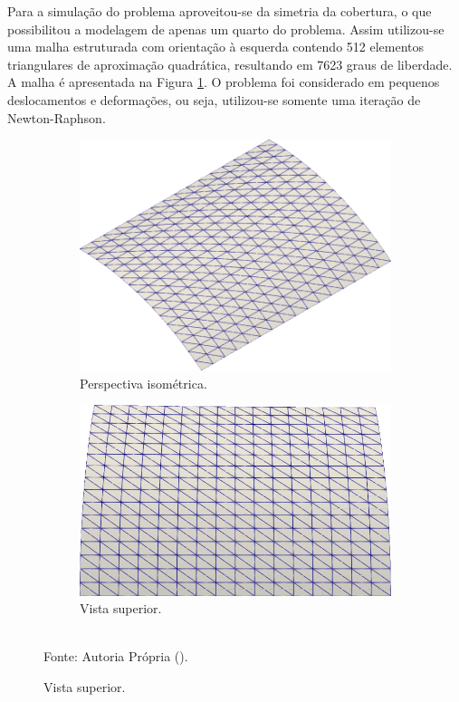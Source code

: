 Para a simulação do problema aproveitou-se da simetria da cobertura, o que possibilitou a modelagem de apenas um quarto do problema. Assim utilizou-se uma malha estruturada com orientação à esquerda contendo 512 elementos triangulares de aproximação quadrática, resultando em 7623 graus de liberdade. A malha é apresentada na Figura \ref{fig:scordelis-mesh}. O problema foi considerado em pequenos deslocamentos e deformações, ou seja, utilizou-se somente uma iteração de Newton-Raphson.

\begin{figure}[h!]
    \centering
    \caption{\textit{Scordelis-Lo roof} - Malha utilizada.}
    \begin{subfigure}{0.35\textwidth}
        \includegraphics[width=\linewidth]{Figuras/scordelis/malha1.png}
        \caption{Perspectiva isométrica.}
    \end{subfigure}
    \begin{subfigure}{0.35\textwidth}
        \includegraphics[width=\linewidth]{Figuras/scordelis/malha2.png}
        \caption{Vista superior.}
    \end{subfigure}
    \\Fonte: Autoria Própria (\the\year).
    \label{fig:scordelis-mesh}
\end{figure}


